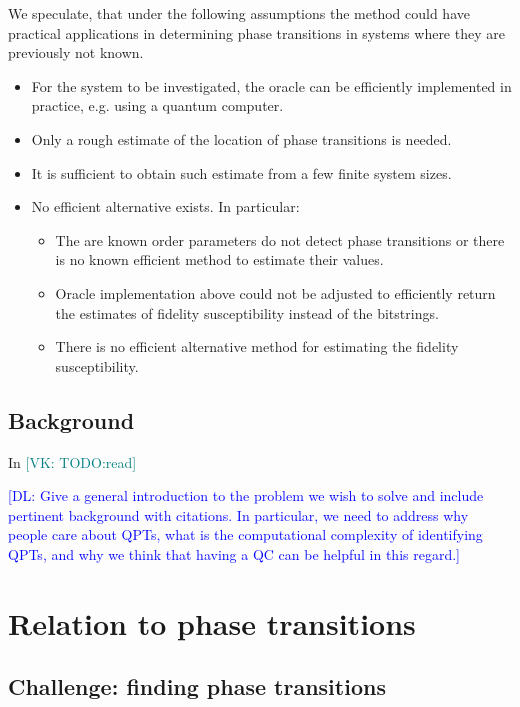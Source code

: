 \documentclass[american,aps,pra,reprint,floatfix,nofootinbib,superscriptaddress]{revtex4-2}
\newcommand{\VK}[1]{\textcolor{teal}{[VK: #1]}}
\newcommand{\DL}[1]{\textcolor{blue}{[DL: #1]}}
\begin{document}
We speculate, that under the following assumptions the method could have
practical applications in determining phase transitions in systems where they
are previously not known.
\begin{itemize}
  \item For the system to be investigated, the oracle can be efficiently
    implemented in practice, e.g. using a quantum computer.
  \item Only a rough estimate of the location of phase transitions is needed.
  \item It is sufficient to obtain such estimate from a few finite system
    sizes.
  \item No efficient alternative exists. In particular:
    \begin{itemize}
      \item The are known order parameters do not detect phase transitions
        or there is no known efficient method to estimate their values.
      \item Oracle implementation above could not be adjusted to efficiently
        return the estimates of fidelity susceptibility instead of the
        bitstrings.
      \item There is no efficient alternative method for estimating the
        fidelity susceptibility.
    \end{itemize}
\end{itemize}

\subsection{Background}
In \cite{gu2008fidelity} \VK{TODO:read}

\DL{Give a general introduction to the problem we wish to solve and include pertinent background with citations. In particular, we need to address why people care about QPTs, what is the computational complexity of identifying QPTs, and why we think that having a QC can be helpful in this regard.}

\section{Relation to phase transitions}
\subsection{Challenge: finding phase transitions}
\end{document}
